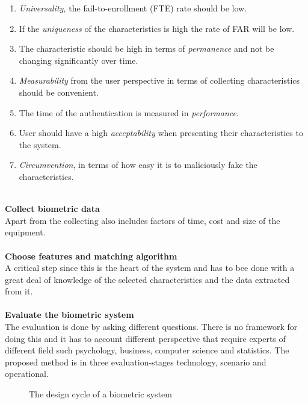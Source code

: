 \begin{enumerate}
	\item \textit{Universality,} the fail-to-enrollment (FTE) rate should be low.
	\item If the \textit{uniqueness} of the characteristics is high the rate of FAR will be low. 
	\item The characteristic should be high in terms of \textit{permanence} and not be changing significantly over time.
	\item \textit{Measurability} from the user perspective in terms of collecting characteristics should be convenient.
	\item The time of the authentication is measured in \textit{performance}.
	\item User should have a high \textit{acceptability} when presenting their characteristics to the system.
	\item \textit{Circumvention}, in terms of how easy it is to maliciously fake the characteristics.
\end{enumerate} 
\\
\textbf{Collect biometric data}\\ 
Apart from the collecting also includes factors of time, cost and size of the equipment.\\
\\
\textbf{Choose features and matching algorithm}\\ 
A critical step since this is the heart of the system and has to bee done with a great deal of knowledge of the selected characteristics and the data extracted from it. \\
\\
\textbf{Evaluate the biometric system}\\ 
The evaluation is done by asking different questions. There is no framework for doing this and it has to account different perspective that require experts of different field such psychology, business, computer science and statistics. The proposed method is in three evaluation-stages technology, scenario and operational. \cite{introbio}
\begin{figure}[!ht]
	
	\caption{\label{fig:biodesigncycle} The design cycle of a biometric system}
\end{figure}
